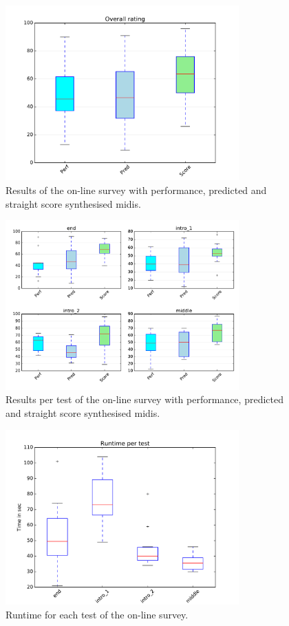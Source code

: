 \begin{appendices}


\begin{figure}
\centering
\includegraphics[width=0.8\textwidth]{Figures/survey.pdf}
\caption{Results of the on-line survey with performance, predicted and straight score synthesised midis.}
\label{fig_app:survey}
\end{figure}

\begin{figure}
\centering
\includegraphics[width=0.8\textwidth]{Figures/survey_tests.pdf}
\caption{Results per test of the on-line survey with performance, predicted and straight score synthesised midis.}
\label{fig_app:survey_test2}
\end{figure}

\begin{figure}
\centering
\includegraphics[width=0.8\textwidth]{Figures/survey_runtime.pdf}
\caption{Runtime for each test of the on-line survey.}
\label{fig_app:survey_runtime}
\end{figure}

\cleardoublepage

\end{appendices}

